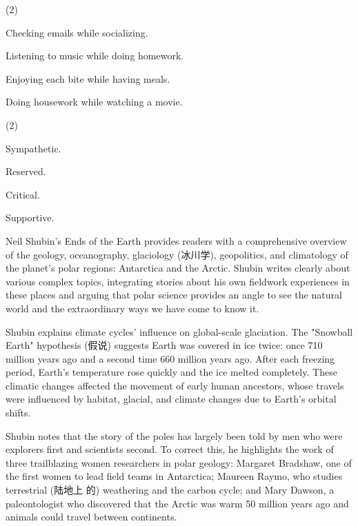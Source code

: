 \documentclass{英语试卷}
\begin{document}
\begin{choices}(2)
  \item Checking emails while socializing.
  \item Listening to music while doing homework.
  \item Enjoying each bite while having meals.
  \item Doing housework while watching a movie.
\end{choices}
\begin{choices}(2)
  \item Sympathetic.
  \item Reserved.
  \item Critical.
  \item Supportive.
\end{choices}
\par Neil Shubin's Ends of the Earth provides readers with a comprehensive overview of the geology, oceanography, glaciology (冰川学), geopolitics, and climatology of the planet's polar regions: Antarctica and the Arctic. Shubin writes clearly about various complex topics, integrating stories about his own fieldwork experiences in these places and arguing that polar science provides an angle to see the natural world and the extraordinary ways we have come to know it.\par
\par Shubin explains climate cycles' influence on global-scale glaciation. The "Snowball Earth" hypothesis (假说) suggests Earth was covered in ice twice: once 710 million years ago and a second time 660 million years ago. After each freezing period, Earth’s temperature rose quickly and the ice melted completely. These climatic changes affected the movement of early human ancestors, whose travels were influenced by habitat, glacial, and climate changes due to Earth’s orbital shifts.\par
\par Shubin notes that the story of the poles has largely been told by men who were explorers first and scientists second. To correct this, he highlights the work of three trailblazing women researchers in polar geology: Margaret Bradshaw, one of the first women to lead field teams in Antarctica; Maureen Raymo, who studies terrestrial (陆地上 的) weathering and the carbon cycle; and Mary Dawson, a paleontologist who discovered that the Arctic was warm 50 million years ago and animals could travel between continents.\par
\end{document}
